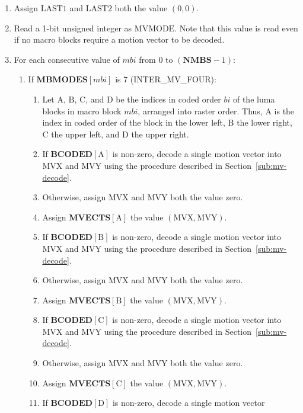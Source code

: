 \documentclass[9pt,letterpaper]{book}
\newcommand{\idx}[1]{{\ensuremath{\mathit{#1}}}}
\newcommand{\bi}{\idx{bi}}
\newcommand{\mbi}{\idx{mbi}}
\newcommand{\bitvar}[1]{\ensuremath{\mathbf{\bm{#1}}}}
\newcommand{\locvar}[1]{\ensuremath{\mathrm{#1}}}
\numberwithin{equation}{chapter}
\numberwithin{figure}{chapter}
\numberwithin{table}{chapter}
\begin{document}
\begin{enumerate}
\item
Assign \locvar{LAST1} and \locvar{LAST2} both the value $(0,0)$.
\item
Read a 1-bit unsigned integer as \locvar{MVMODE}.
Note that this value is read even if no macro blocks require a motion vector to
 be decoded.
\item
For each consecutive value of \locvar{\mbi} from 0 to $(\bitvar{NMBS}-1)$:
\begin{enumerate}
\item
If $\bitvar{MBMODES}[\locvar{\mbi}]$ is 7 (INTER\_MV\_FOUR):
\begin{enumerate}
\item
Let \locvar{A}, \locvar{B}, \locvar{C}, and \locvar{D} be the indices in coded
 order \locvar{\bi} of the luma blocks in macro block \locvar{\mbi}, arranged
 into raster order.
Thus, \locvar{A} is the index in coded order of the block in the lower left,
 \locvar{B} the lower right, \locvar{C} the upper left, and \locvar{D} the
 upper right. %
\item
If $\bitvar{BCODED}[\locvar{A}]$ is non-zero, decode a single motion vector
 into \locvar{MVX} and \locvar{MVY} using the procedure described in
 Section~\ref{sub:mv-decode}.
\item
Otherwise, assign \locvar{MVX} and \locvar{MVY} both the value zero.
\item
Assign $\bitvar{MVECTS}[\locvar{A}]$ the value $(\locvar{MVX},\locvar{MVY})$.
\item
If $\bitvar{BCODED}[\locvar{B}]$ is non-zero, decode a single motion vector
 into \locvar{MVX} and \locvar{MVY} using the procedure described in
 Section~\ref{sub:mv-decode}.
\item
Otherwise, assign \locvar{MVX} and \locvar{MVY} both the value zero.
\item
Assign $\bitvar{MVECTS}[\locvar{B}]$ the value $(\locvar{MVX},\locvar{MVY})$.
\item
If $\bitvar{BCODED}[\locvar{C}]$ is non-zero, decode a single motion vector
 into \locvar{MVX} and \locvar{MVY} using the procedure described in
 Section~\ref{sub:mv-decode}.
\item
Otherwise, assign \locvar{MVX} and \locvar{MVY} both the value zero.
\item
Assign $\bitvar{MVECTS}[\locvar{C}]$ the value $(\locvar{MVX},\locvar{MVY})$.
\item
If $\bitvar{BCODED}[\locvar{D}]$ is non-zero, decode a single motion vector

\end{enumerate}
\end{enumerate}
\end{enumerate}
\end{document}
